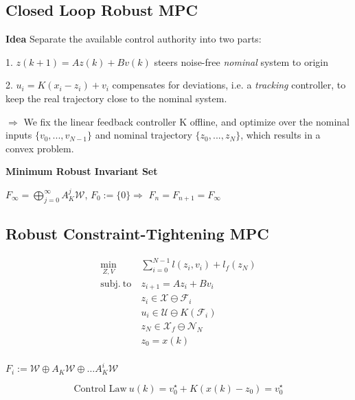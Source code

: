 \subsection{Closed Loop Robust MPC}


\textbf{Idea}
Separate the available control authority into two parts:

1.
$z(k+1)=Az(k)+Bv(k)$
steers
noise-free \textit{nominal} system
to origin

2.
$u_i=K(x_i-z_i)+v_i$
compensates for deviations,
i.e. a \textit{tracking} controller,
to keep the real trajectory
close to the nominal system.

$\Rightarrow$
We fix the linear feedback controller K offline,
and optimize over the nominal inputs $\{v_0,...,v_{N−1}\}$
and nominal trajectory $\{z_0,...,z_N\}$,
which results in a convex problem.


\textbf{Minimum Robust Invariant Set}

$F_\infty = \bigoplus_{j=0}^\infty A_K^j \mathcal{W}$,
$F_0 := \{0\}\Rightarrow$
$F_n = F_{n+1} = F_\infty$%


\begin{sstTitleBox}{\subsection{Robust Constraint-Tightening MPC}}

	\[\begin{aligned}
			\min_{Z,V} \         & \sum_{i=0}^{N-1} l(z_i, v_i) + l_f(z_N)      \\
			\mathrm{subj.\ to}\  & z_{i+1} = Az_i + Bv_i                        \\
			                     & z_i \in \mathcal{X} \ominus \mathcal{F}_i    \\
			                     & u_i \in \mathcal{U} \ominus K(\mathcal{F}_i) \\
			                     & z_N \in \mathcal{X}_f \ominus \mathcal{N}_N  \\
			                     & z_0 = x(k)                                   \\
		\end{aligned}\]

	$F_i := \mathcal{W} \oplus A_K\mathcal{W} \oplus \dots A_K^{i}\mathcal{W}$

	$$\text{Control\ Law}\   u(k) = v_0^\star + K(x(k)-z_0) = v_0^\star$$

\end{sstTitleBox}

